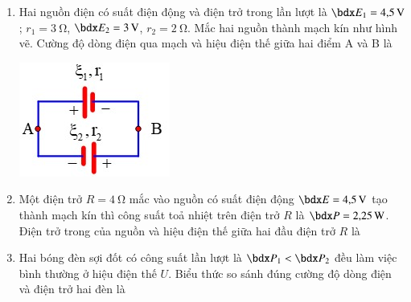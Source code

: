 \begin{enumerate}[label=\bfseries Câu \arabic*:]
\item Hai nguồn điện có suất điện động và điện trở trong lần lượt là $\calE_1=\SI{4.5}{\volt}$; $r_1=\SI{3}{\ohm}$, $\calE_2=\SI{3}{\volt}$, $r_2=\SI{2}{\ohm}$. Mắc hai nguồn thành mạch kín như hình vẽ. Cường độ dòng điện qua mạch và hiệu điện thế giữa hai điểm A và B là
\begin{center}
	\includegraphics[width=0.2\linewidth]{../figs/PH11-FinalSem2-02-2}
\end{center}

\item Một điện trở $R=\SI{4}{\ohm}$ mắc vào nguồn có suất điện động $\calE=\SI{4.5}{\volt}$ tạo thành mạch kín thì công suất toả nhiệt trên điện trở $R$ là $\calP=\SI{2.25}{\watt}$. Điện trở trong của nguồn và hiệu điện thế giữa hai đầu điện trở $R$ là

\item Hai bóng đèn sợi đốt có công suất lần lượt là $\calP_1<\calP_2$ đều làm việc bình thường ở hiệu điện thế $U$. Biểu thức so sánh đúng cường độ dòng điện và điện trở hai đèn là
\end{enumerate}
